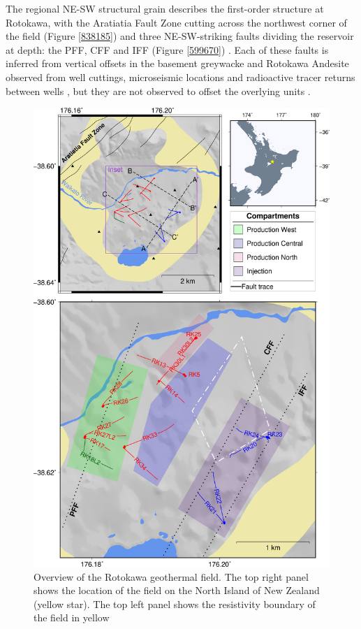 The regional NE-SW structural grain describes the first-order structure at Rotokawa, with the Aratiatia Fault Zone cutting across the northwest corner of the field (Figure \ref{838185}) and three NE-SW-striking faults dividing the reservoir at depth: the \acrfull{PFF}, \acrfull{CFF} and \acrfull{IFF} (Figure \ref{599670}) \citep{wallis2013}. Each of these faults is inferred from vertical offsets in the basement greywacke and Rotokawa Andesite observed from well cuttings, microseismic locations and radioactive tracer returns between wells \citep{Sewell_2015,Addison_2017stanford,wallis2013}, but they are not observed to offset the overlying units \citep{wallis2013}.

\begin{figure}[p]
\begin{center}
\includegraphics[width=0.73\columnwidth,height=\textheight,keepaspectratio]{Chapter_1_Intro/figures/merc_Rot_overview/merc_Rot_overview_struct_inset_NI_compartments}
\caption[Overview of the Rotokawa geothermal field]{{
Overview of the Rotokawa geothermal field. The top right panel shows the
location of the field on the North Island of New Zealand (yellow star).
The top left panel shows the resistivity boundary of the field in yellow
}}
\end{center}
\end{figure}
